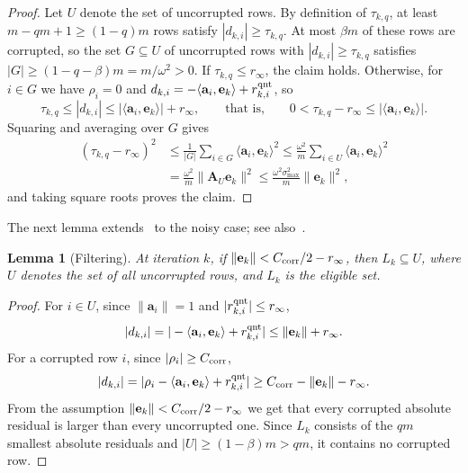 \documentclass[pdflatex,sn-mathphys-num]{sn-jnl}
\theoremstyle{thmstyleone}
\newtheorem{lemma}{Lemma}
\theoremstyle{thmstylethree}
\newcommand{\mA}{\mathbf{A}}
\newcommand{\va}{\mathbf{a}}
\newcommand{\ve}{\mathbf{e}}
\begin{document}
\begin{proof}
Let $U$ denote the set of
uncorrupted rows. By definition of $\tau_{k,q}$, at
least $m-qm+1\ge(1-q)m$ rows satisfy $|d_{k,i}|\ge\tau_{k,q}$. At most
$\beta m$ of these rows are corrupted, so the set $G\subseteq U$ of
uncorrupted rows with $|d_{k,i}|\ge\tau_{k,q}$ satisfies
$|G|\ge(1-q-\beta)m=m/\omega^2>0$. If $\tau_{k,q}\le r_\infty$, the claim
holds. Otherwise, for $i\in G$ we have $\rho_i=0$ and
$d_{k,i}=-\langle\va_i,\ve_k\rangle+r^{\rm qnt}_{k,i}$, so
\[
\tau_{k,q}\le|d_{k,i}|\le|\langle\va_i,\ve_k\rangle|+r_\infty,
\qquad\text{that is,}\qquad
0<\tau_{k,q}-r_\infty\le|\langle\va_i,\ve_k\rangle| .
\]
Squaring and averaging over $G$ gives
\[
\begin{aligned}
(\tau_{k,q}-r_\infty)^2
&\le\frac{1}{|G|}\sum_{i\in G}\langle\va_i,\ve_k\rangle^2
\le\frac{\omega^2}{m}\sum_{i\in U}\langle\va_i,\ve_k\rangle^2\\
&=\frac{\omega^2}{m}\|\mA_U\ve_k\|^2
\le\frac{\omega^2\sigma_{\max}^2}{m}\|\ve_k\|^2 ,
\end{aligned}
\]
and taking square roots proves the claim.
\end{proof}

The next lemma extends~\cite[Lemma~1]{haddock2019randomized} to the noisy
case; see also~\cite[Lemma~3.2]{shvaiko2026whitelist}.

\begin{lemma}[Filtering]
\label{lem:filtering}
At iteration $k$, if $\|\ve_k\|<C_{\rm corr}/2-r_\infty$, then $L_k\subseteq U$, where $U$ denotes the set of all uncorrupted rows, and $L_k$ is the eligible set.
\end{lemma}

\begin{proof}
For $i\in U$, since $\|\va_i\|=1$ and $|r^{\rm qnt}_{k,i}|\le r_\infty$,
\[
|d_{k,i}|=|-\langle\va_i,\ve_k\rangle+r^{\rm qnt}_{k,i}|
\le\|\ve_k\|+r_\infty .
\]
For a corrupted row $i$, since $|\rho_i|\ge C_{\rm corr}$,
\[
|d_{k,i}|=|\rho_i-\langle\va_i,\ve_k\rangle+r^{\rm qnt}_{k,i}|
\ge C_{\rm corr}-\|\ve_k\|-r_\infty .
\]
From the assumption $\|\ve_k\|<C_{\rm corr}/2-r_\infty$ we get that every corrupted
absolute residual is larger than every uncorrupted one. Since $L_k$ consists
of the $qm$ smallest absolute residuals and $|U|\ge(1-\beta)m>qm$, it
contains no corrupted row.
\end{proof}
\end{document}
